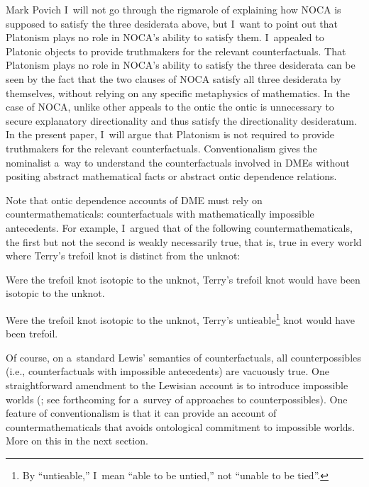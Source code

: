 \begin{artengenv}{Mark Povich}
I~will not go through the rigmarole of explaining how NOCA is supposed to satisfy the three desiderata above, but I~want to point out that Platonism plays no role in NOCA's ability to satisfy them. I~appealed to Platonic objects to provide truthmakers for the relevant counterfactuals. That Platonism plays no role in NOCA's ability to satisfy the three desiderata can be seen by the fact that the two clauses of NOCA satisfy all three desiderata by themselves, without relying on any specific metaphysics of mathematics. In the case of NOCA, unlike other appeals to the ontic
\parencites[e.g., to causation in the case of Bromberger's flagpole;][]{salmon_scientific_1984}{salmon_four_1989}
 the ontic is unnecessary to secure explanatory directionality and thus satisfy the directionality desideratum. In the present paper, I~will argue that Platonism is not required to provide truthmakers for the relevant counterfactuals. Conventionalism gives the nominalist a~way to understand the counterfactuals involved in DMEs without positing abstract mathematical facts or abstract ontic dependence relations.

Note that ontic dependence accounts of DME must rely on countermathematicals: counterfactuals with mathematically impossible antecedents. For example, I~argued that of the following countermathematicals, the first but not the second is weakly necessarily true, that is, true in every world where Terry's trefoil knot is distinct from the unknot:

Were the trefoil knot isotopic to the unknot, Terry's trefoil knot would have been isotopic to the unknot.

Were the trefoil knot isotopic to the unknot, Terry's untieable\footnote{By ``untieable,'' I~mean ``able to be untied,'' not ``unable to be tied''.} knot would have been trefoil.

Of course, on a~standard Lewis'
\parencite*[][]{lewis_counterfactuals_1973} %
 semantics of counterfactuals, all counterpossibles (i.e., counterfactuals with impossible antecedents) are vacuously true. One straightforward amendment to the Lewisian account is to introduce impossible worlds 
(\cite[][]{brogaard_remarks_2013}; see \citeauthor{kocurek_counterpossibles_2021} forthcoming for a~survey of approaches to counterpossibles). %
 One feature of conventionalism is that it can provide an account of countermathematicals that avoids ontological commitment to impossible worlds. More on this in the next section.


\end{artengenv}
